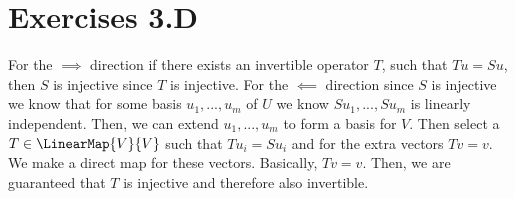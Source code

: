 \section{Exercises 3.D}
\begin{q}[3]
    For the $ \implies $ direction if there exists an invertible operator $ T $, such that $ Tu = Su $, then $ S $ is injective since $ T $ is injective.
    For the $ \impliedby $ direction since $ S $ is injective we know that for some basis $ u_1, ..., u_m $ of $ U $ we know $ Su_1, ..., Su_m $ is linearly independent. 
    Then, we can extend $ u_1, ..., u_m $ to form a basis for $ V $. 
    Then select a $ T \in \LinearMap{V}{V} $ such that $ Tu_i = Su_i $ and for the extra vectors $ Tv = v $. 
    We make a direct map for these vectors. 
    Basically, $ Tv = v $. 
    Then, we are guaranteed that $ T $ is injective and therefore also invertible.  
\end{q}

